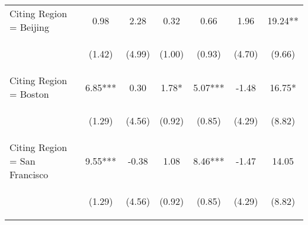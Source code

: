 \begin{center}
\begin{tabular}{lcccccc}
Citing Region = Beijing & 0.98 & 2.28 & 0.32 & 0.66 & 1.96 & 19.24** \\
\vspace{4pt} & \begin{footnotesize}(1.42)\end{footnotesize} & \begin{footnotesize}(4.99)\end{footnotesize} & \begin{footnotesize}(1.00)\end{footnotesize} & \begin{footnotesize}(0.93)\end{footnotesize} & \begin{footnotesize}(4.70)\end{footnotesize} & \begin{footnotesize}(9.66)\end{footnotesize} \\
Citing Region = Boston & 6.85*** & 0.30 & 1.78* & 5.07*** & -1.48 & 16.75* \\
\vspace{4pt} & \begin{footnotesize}(1.29)\end{footnotesize} & \begin{footnotesize}(4.56)\end{footnotesize} & \begin{footnotesize}(0.92)\end{footnotesize} & \begin{footnotesize}(0.85)\end{footnotesize} & \begin{footnotesize}(4.29)\end{footnotesize} & \begin{footnotesize}(8.82)\end{footnotesize} \\
Citing Region = San Francisco & 9.55*** & -0.38 & 1.08 & 8.46*** & -1.47 & 14.05 \\
\vspace{4pt} & \begin{footnotesize}(1.29)\end{footnotesize} & \begin{footnotesize}(4.56)\end{footnotesize} & \begin{footnotesize}(0.92)\end{footnotesize} & \begin{footnotesize}(0.85)\end{footnotesize} & \begin{footnotesize}(4.29)\end{footnotesize} & \begin{footnotesize}(8.82)\end{footnotesize} \\

\end{tabular}
\end{center}
